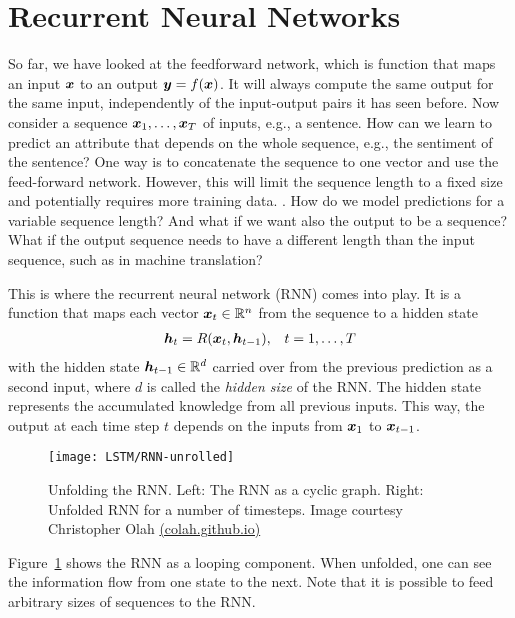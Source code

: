 	\section{Recurrent Neural Networks}\label{sec:recurrent_neural_networks}
		\newcommand{\imagecourtesycolah}{Image courtesy Christopher Olah \mbox{\href{http://colah.github.io/}{(colah.github.io)}}}
		So far, we have looked at the feedforward network, which is function that maps an input $\bm{x}$ to an output $\bm{y} = f(\bm{x})$.
		It will always compute the same output for the same input, independently of the input-output pairs it has seen before.
		Now consider a sequence $\bm{x}_1, \dots, \bm{x}_T$ of inputs, e.g., a sentence.
		How can we learn to predict an attribute that depends on the whole sequence, e.g., the sentiment of the sentence?
		One way is to concatenate the sequence to one vector and use the feed-forward network.
		However, this will limit the sequence length to a fixed size and potentially requires more training data.
		.
		How do we model predictions for a variable sequence length?
		And what if we want also the output to be a sequence? 
		What if the output sequence needs to have a different length than the input sequence, such as in machine translation? 
		
		This is where the recurrent neural network (RNN) comes into play.
		It is a function that maps each vector $\bm{x}_t \in \mathbb{R}^n$ from the sequence to a hidden state
		\begin{eqnarray}
			\bm{h}_t = R(\bm{x}_t, \bm{h}_{t-1}), & &t = 1, \dots, T
		\end{eqnarray}
		with the hidden state $\bm{h}_{t-1} \in \mathbb{R}^d$ carried over from the previous prediction as a second input, where $d$ is called the \emph{hidden size} of the RNN. 
		The hidden state represents the accumulated knowledge from all previous inputs.
		This way, the output at each time step $t$ depends on the inputs from $\bm{x}_1$ to $\bm{x}_{t - 1}$.
		\begin{figure}[tb]
			\centering
			\texttt{[image: LSTM/RNN-unrolled]}
			\caption[Unfolding the RNN]
			{Unfolding the RNN. Left: The RNN as a cyclic graph. 
				Right: Unfolded RNN for a number of timesteps.
				\imagecourtesycolah}
			\label{fig:RNN-unrolled}
		\end{figure}
		Figure~\ref{fig:RNN-unrolled} shows the RNN as a looping component.
		When unfolded, one can see the information flow from one state to the next.
		Note that it is possible to feed arbitrary sizes of sequences to the RNN.
		
